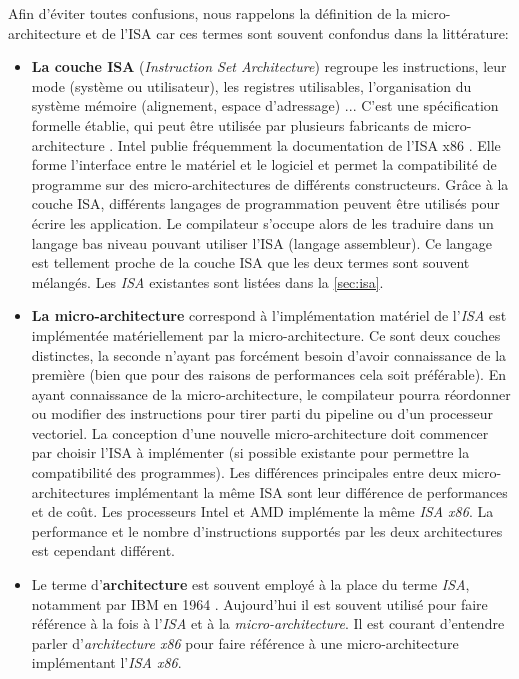 Afin d'éviter toutes confusions, nous rappelons la définition de la micro-architecture et de l'ISA car ces termes sont souvent confondus dans la littérature:

\begin{itemize}
    \item  \textbf{La couche ISA} (\textit{Instruction Set Architecture}) regroupe les instructions, leur mode (système ou utilisateur), les registres utilisables, l'organisation du système mémoire (alignement, espace d'adressage) ... 
    C'est une spécification formelle établie, qui peut être utilisée par plusieurs fabricants de micro-architecture \cite{tanenbaum2016structured}. Intel publie fréquemment la documentation de l'ISA x86 \cite{guide2011intel}. Elle forme l'interface entre le matériel et le logiciel et permet la compatibilité de programme sur des micro-architectures de différents constructeurs. 
    Grâce à la couche ISA, différents langages de programmation peuvent être utilisés pour écrire les application. Le compilateur s'occupe alors de les traduire dans un langage bas niveau pouvant utiliser l'ISA (langage assembleur). Ce langage est tellement proche de la couche ISA que les deux termes sont souvent mélangés. Les \textit{ISA} existantes sont listées dans la \autoref{sec:isa}. 

    \item \textbf{La micro-architecture} correspond à l'implémentation matériel de l'\textit{ISA} est implémentée matériellement par la micro-architecture. Ce sont deux couches distinctes, la seconde n'ayant pas forcément besoin d'avoir connaissance de la première (bien que pour des raisons de performances cela soit préférable). En ayant connaissance de la micro-architecture, le compilateur pourra réordonner ou modifier des instructions pour tirer parti du pipeline ou d'un processeur vectoriel. La conception d'une nouvelle micro-architecture doit commencer par choisir l'ISA à implémenter (si possible existante pour permettre la compatibilité des programmes). Les différences principales entre deux micro-architectures implémentant la même ISA sont leur différence de performances et de coût. Les processeurs Intel et AMD implémente la même \textit{ISA x86}. La performance et le nombre d'instructions supportés par les deux architectures est cependant différent.
    
    \item Le terme d'\textbf{architecture} est souvent employé à la place du terme \textit{ISA}, notamment par IBM en 1964 \cite{amdahl1964architecture}.  Aujourd'hui il est souvent utilisé pour faire référence à la fois à l'\textit{ISA} et à la \textit{micro-architecture}. Il est courant d'entendre parler d'\textit{architecture x86} pour faire référence à une micro-architecture implémentant l'\textit{ISA x86}.\\ 
\end{itemize}


